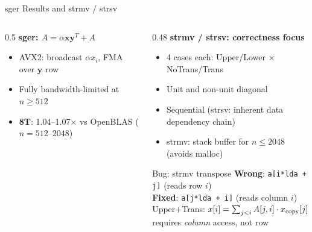 \documentclass[aspectratio=169,10pt]{beamer}
\begin{document}
\begin{frame}{sger Results and strmv / strsv}
  \begin{columns}
    \begin{column}{0.5\textwidth}
      \textbf{sger: $A = \alpha\mathbf{x}\mathbf{y}^T + A$}
      \begin{itemize}
        \item AVX2: broadcast $\alpha x_i$, FMA over $\mathbf{y}$ row
        \item Fully bandwidth-limited at $n \geq 512$
        \item \textbf{8T}: 1.04--1.07$\times$ vs OpenBLAS ($n=512$--$2048$)
      \end{itemize}
    \end{column}
    \begin{column}{0.48\textwidth}
      \textbf{strmv / strsv: correctness focus}
      \begin{itemize}
        \item 4 cases each: Upper/Lower $\times$ NoTrans/Trans
        \item Unit and non-unit diagonal
        \item Sequential (strsv: inherent data dependency chain)
        \item strmv: stack buffer for $n \leq 2048$ (avoids malloc)
      \end{itemize}
      \begin{alertblock}{Bug: strmv transpose}
        \scriptsize
        \textbf{Wrong}: \texttt{a[i*lda + j]} (reads row $i$)\\
        \textbf{Fixed}: \texttt{a[j*lda + i]} (reads column $i$)\\[0.2em]
        Upper+Trans: $x[i] = \sum_{j<i} A[j,i] \cdot x_{\rm copy}[j]$\\
        requires \emph{column} access, not row
      \end{alertblock}
    \end{column}
  \end{columns}
\end{frame}
\end{document}

